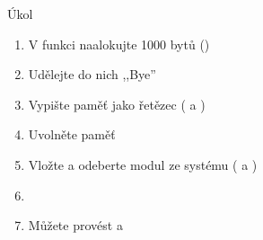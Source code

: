 \begin{frame}{Úkol}

  \begin{enumerate}
    \item V  funkci naalokujte 1000 bytů ()
    \item Udělejte do nich  ,,Bye''
    \item Vypište paměť jako řetězec ( a )
    \item Uvolněte paměť
    \item Vložte a odeberte modul ze systému ( a )
    \item {}
    \item Můžete provést  \iffimuni a  \fi
  \end{enumerate}
\end{frame}


